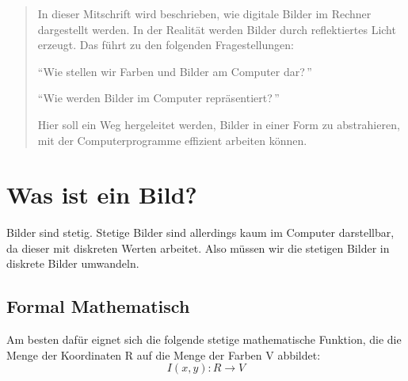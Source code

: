 

\maketitle



\begin{abstract}
In dieser Mitschrift wird beschrieben, wie digitale Bilder im Rechner dargestellt werden.
In der Realität werden Bilder durch reflektiertes Licht erzeugt.
Das führt zu den folgenden Fragestellungen:

"`Wie stellen wir Farben und Bilder am Computer dar?\,"'

"`Wie werden Bilder im Computer repräsentiert?\,"'

Hier soll ein Weg hergeleitet werden, Bilder in einer Form zu abstrahieren, mit der Computerprogramme effizient arbeiten können.
\end{abstract}

\section{Was ist ein Bild?}

Bilder sind stetig. Stetige Bilder sind allerdings kaum im Computer darstellbar, da dieser mit diskreten Werten arbeitet. Also müssen wir die stetigen Bilder in diskrete Bilder umwandeln.

\subsection{Formal Mathematisch}
Am besten dafür eignet sich die folgende stetige mathematische Funktion, die die Menge der Koordinaten R auf die Menge der Farben V abbildet:
\begin{equation}\label{eq:eins}I(x,y): R \rightarrow V\end{equation}

